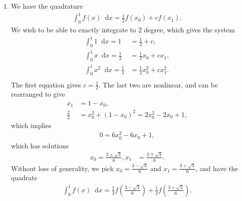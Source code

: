 \documentclass[10pt]{article}
\newcommand*{\dif}{\mathop{}\!\mathrm{d}}
\begin{document}
\begin{enumerate}
    \item We have the quadrature \begin{align*}
        \int_0^1 f(x)\dif x = \frac{1}{2}f(x_0) + cf(x_1).
    \end{align*} We wish to be able to exactly integrate to 2 degree, which gives the system \begin{align*}
        \int_0^1 1 \dif x = 1 &= \frac{1}{2} + c, \\
        \int_0^1 x \dif x = \frac{1}{2} &= \frac{1}{2}x_0 + cx_1, \\
        \int_0^1 x^2 \dif x = \frac{1}{3} &= \frac{1}{2}x_0^2 + cx_1^2. \\
    \end{align*} The first equation gives \(c=\frac{1}{2}\). The last two are nonlinear, and can be rearranged to give \begin{align*}
        x_1 &= 1 - x_0, \\
        \frac{2}{3} &= x_0^2 + (1-x_0)^2 = 2x_0^2 -2x_0 + 1, 
    \end{align*} which implies \begin{align*}
        0 = 6x_0^2 - 6x_0 + 1,
    \end{align*} which has solutions \begin{align*}
        x_0 = \frac{3 \pm \sqrt{3}}{6}, x_1 &= \frac{3 \mp \sqrt{3}}{6}.
    \end{align*} Without loss of generality, we pick \(x_0 = \frac{3 - \sqrt{3}}{6}\) and \(x_1 = \frac{3 + \sqrt{3}}{6}\), and have the quadrate \begin{align*}
      \int_0^1 f(x)\dif x = \frac{1}{2}f\left(\frac{3 - \sqrt{3}}{6}\right) + \frac{1}{2}f\left(\frac{3 + \sqrt{3}}{6}\right).
    \end{align*}

\end{enumerate}
\end{document}
